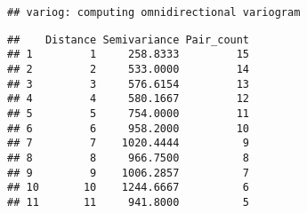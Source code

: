 \documentclass[]{book}
\newenvironment{Shaded}{\begin{snugshade}}{\end{snugshade}}
\newcommand{\CommentTok}[1]{\textcolor[rgb]{0.56,0.35,0.01}{\textit{#1}}}
\newcommand{\DataTypeTok}[1]{\textcolor[rgb]{0.13,0.29,0.53}{#1}}
\newcommand{\KeywordTok}[1]{\textcolor[rgb]{0.13,0.29,0.53}{\textbf{#1}}}
\newcommand{\NormalTok}[1]{#1}
\newcommand{\OperatorTok}[1]{\textcolor[rgb]{0.81,0.36,0.00}{\textbf{#1}}}
\newcommand{\StringTok}[1]{\textcolor[rgb]{0.31,0.60,0.02}{#1}}
\begin{document}
\begin{verbatim}
## variog: computing omnidirectional variogram
\end{verbatim}

\begin{Shaded}
\end{Shaded}

\begin{verbatim}
##    Distance Semivariance Pair_count
## 1         1     258.8333         15
## 2         2     533.0000         14
## 3         3     576.6154         13
## 4         4     580.1667         12
## 5         5     754.0000         11
## 6         6     958.2000         10
## 7         7    1020.4444          9
## 8         8     966.7500          8
## 9         9    1006.2857          7
## 10       10    1244.6667          6
## 11       11     941.8000          5
\end{verbatim}
\end{document}
